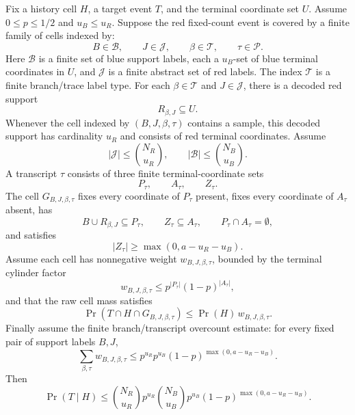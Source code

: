 \begin{helper}
Fix a history cell \(H\), a target event \(T\), and the terminal coordinate
set \(U\).  Assume \(0\le p\le 1/2\) and \(u_B\le u_R\).  Suppose the red
fixed-count event is
covered by a finite family of cells indexed by:
\[
B\in\mathcal B,\qquad J\in\mathcal J,\qquad
\beta\in\mathcal T,\qquad \tau\in\mathcal P .
\]
Here \(\mathcal B\) is a finite set of blue support labels, each a
\(u_B\)-set of blue terminal coordinates in \(U\), and
\(\mathcal J\) is a finite abstract set of red labels.  The index
\(\mathcal T\) is a finite branch/trace label type.  For each
\(\beta\in\mathcal T\) and \(J\in\mathcal J\), there is a decoded red support
\[
R_{\beta,J}\subseteq U.
\]
Whenever the cell indexed by \((B,J,\beta,\tau)\) contains a sample, this
decoded support has cardinality \(u_R\) and consists of red terminal
coordinates.  Assume
\[
|\mathcal J|\le \binom{N_R}{u_R},\qquad
|\mathcal B|\le \binom{N_B}{u_B}.
\]
A transcript \(\tau\) consists of three finite terminal-coordinate sets
\[
P_\tau,\qquad A_\tau,\qquad Z_\tau .
\]
The cell \(G_{B,J,\beta,\tau}\) fixes every coordinate of \(P_\tau\) present,
fixes every coordinate of \(A_\tau\) absent, has
\[
B\cup R_{\beta,J}\subseteq P_\tau,\qquad
Z_\tau\subseteq A_\tau,\qquad
P_\tau\cap A_\tau=\emptyset,
\]
and satisfies
\[
|Z_\tau|\ge \max(0,a-u_R-u_B).
\]
Assume each cell has nonnegative weight \(w_{B,J,\beta,\tau}\), bounded by
the terminal cylinder factor
\[
w_{B,J,\beta,\tau}
\le p^{|P_\tau|}(1-p)^{|A_\tau|},
\]
and that the raw cell mass satisfies
\[
\Pr(T\cap H\cap G_{B,J,\beta,\tau})
\le
\Pr(H)\,w_{B,J,\beta,\tau}.
\]
Finally assume the finite branch/transcript overcount estimate: for every
fixed pair of support labels \(B,J\),
\[
\sum_{\beta,\tau} w_{B,J,\beta,\tau}
\le
p^{u_R}p^{u_B}(1-p)^{\max(0,a-u_R-u_B)}.
\]
Then
\[
\Pr(T\mid H)\le
\binom{N_R}{u_R}p^{u_R}
\binom{N_B}{u_B}p^{u_B}
(1-p)^{\max(0,a-u_R-u_B)} .
\]
\end{helper}
